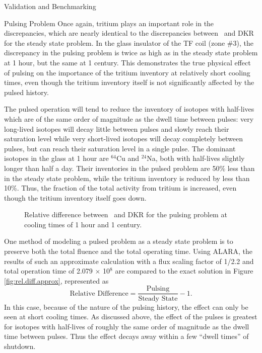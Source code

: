 \begin{chapter}{Validation and Benchmarking}
\begin{section}{Pulsing Problem\label{sec:valid.pulse}}
    Once again, tritium plays an important role in the discrepancies,
    which are nearly identical to the discrepancies between \ALARA\ 
    and DKR for the steady state problem.  In the glass insulator of
    the TF coil (zone \#3), the discrepancy in the pulsing problem is
    twice as high as in the steady state problem at 1 hour, but the
    same at 1 century.  This demonstrates the true physical effect of
    pulsing on the importance of the tritium inventory at relatively
    short cooling times, even though the tritium inventory itself is
    not significantly affected by the pulsed history.  
    
    The pulsed operation will tend to reduce the inventory of isotopes
    with half-lives which are of the same order of magnitude as the
    dwell time between pulses: very long-lived isotopes will decay
    little between pulses and slowly reach their saturation level
    while very short-lived isotopes will decay completely between
    pulses, but can reach their saturation level in a single
    pulse\cite{Pulsar}.  The dominant isotopes in the glass at 1 hour
    are $^{64}$Cu and $^{24}$Na, both with half-lives slightly longer
    than half a day.  Their inventories in the pulsed problem are 50\%
    less than in the steady state problem, while the tritium inventory
    is reduced by less than 10\%.  Thus, the fraction of the total
    activity from tritium is increased, even though the tritium
    inventory itself goes down.

    \begin{figure}[htbp]
      \begin{center}
        \caption{Relative difference between \ALARA\  and DKR for
          the pulsing problem at cooling times of 1 hour and 1 century.}
        \label{fig:rel.diff.p.1}
      \end{center}
    \end{figure}
    
    One method of modeling a pulsed problem as a steady state problem
    is to preserve both the total fluence and the total operating
    time\cite{Pulsar,hosny,qingming}.  Using ALARA, the results of
    such an approximate calculation with a flux scaling factor of
    1/2.2 and total operation time of 2.079 $\times$ 10$^8$ are
    compared to the exact solution in Figure
    \ref{fig:rel.diff.approx}, represented as
    $$\mbox{Relative Difference} = \frac{\mbox{Pulsing}}{\mbox{Steady
        State}} - 1.$$
    In this case, because of the nature of the
    pulsing history, the effect can only be seen at short cooling
    times.  As discussed above, the effect of the pulses is greatest
    for isotopes with half-lives of roughly the same order of
    magnitude as the dwell time between pulses.  Thus the effect
    decays away within a few ``dwell times'' of shutdown.
    

\end{section}
\end{chapter}
